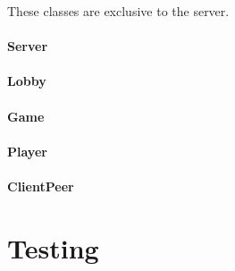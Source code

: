 \documentclass[12pt, letterpaper]{article}
\begin{document}
    These classes are exclusive to the server.


    \paragraph{Server}

    \paragraph{Lobby}

    \paragraph{Game}

    \paragraph{Player}

    \paragraph{ClientPeer}


    \section{Testing}
    \label{sec:testing}


\end{document}
